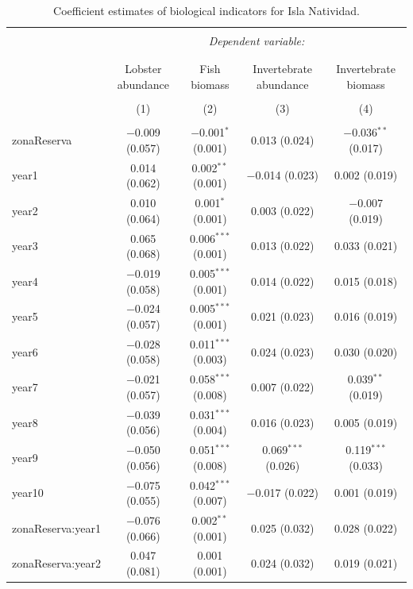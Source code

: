 \documentclass[utf8]{frontiers_suppmat} %
\begin{document}
\begin{table}[!htbp] \centering 
  \caption{Coefficient estimates of biological indicators for Isla Natividad.} 
  \label{} 
\tiny 
\begin{tabular}{@{\extracolsep{1pt}}lcccc} 
\\[-1.8ex]\hline 
\hline \\[-1.8ex] 
 & \multicolumn{4}{c}{\textit{Dependent variable:}} \\ 
\cline{2-5} 
\\[-1.8ex] & \multicolumn{4}{c}{} \\ 
 & Lobster abundance & Fish biomass & Invertebrate abundance & Invertebrate biomass \\ 
\\[-1.8ex] & (1) & (2) & (3) & (4)\\ 
\hline \\[-1.8ex] 
 zonaReserva & $-$0.009 (0.057) & $-$0.001$^{*}$ (0.001) & 0.013 (0.024) & $-$0.036$^{**}$ (0.017) \\ 
  year1 & 0.014 (0.062) & 0.002$^{**}$ (0.001) & $-$0.014 (0.023) & 0.002 (0.019) \\ 
  year2 & 0.010 (0.064) & 0.001$^{*}$ (0.001) & 0.003 (0.022) & $-$0.007 (0.019) \\ 
  year3 & 0.065 (0.068) & 0.006$^{***}$ (0.001) & 0.013 (0.022) & 0.033 (0.021) \\ 
  year4 & $-$0.019 (0.058) & 0.005$^{***}$ (0.001) & 0.014 (0.022) & 0.015 (0.018) \\ 
  year5 & $-$0.024 (0.057) & 0.005$^{***}$ (0.001) & 0.021 (0.023) & 0.016 (0.019) \\ 
  year6 & $-$0.028 (0.058) & 0.011$^{***}$ (0.003) & 0.024 (0.023) & 0.030 (0.020) \\ 
  year7 & $-$0.021 (0.057) & 0.058$^{***}$ (0.008) & 0.007 (0.022) & 0.039$^{**}$ (0.019) \\ 
  year8 & $-$0.039 (0.056) & 0.031$^{***}$ (0.004) & 0.016 (0.023) & 0.005 (0.019) \\ 
  year9 & $-$0.050 (0.056) & 0.051$^{***}$ (0.008) & 0.069$^{***}$ (0.026) & 0.119$^{***}$ (0.033) \\ 
  year10 & $-$0.075 (0.055) & 0.042$^{***}$ (0.007) & $-$0.017 (0.022) & 0.001 (0.019) \\ 
  zonaReserva:year1 & $-$0.076 (0.066) & 0.002$^{**}$ (0.001) & 0.025 (0.032) & 0.028 (0.022) \\ 
  zonaReserva:year2 & 0.047 (0.081) & 0.001 (0.001) & 0.024 (0.032) & 0.019 (0.021) \\ 

\end{tabular}
\end{table}
\end{document}
